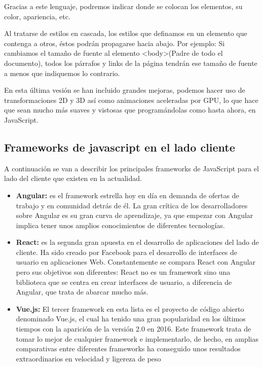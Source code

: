 Gracias a este lenguaje, podremos indicar donde se colocan los elementos, su color, apariencia, etc.

Al tratarse de estilos en cascada, los estilos que definamos en un elemento que contenga a otros, éstos podrán propagarse hacia abajo. Por ejemplo: Si cambiamos el tamaño de fuente al elemento <body>(Padre de todo el documento), todos los párrafos y links de la página tendrán ese tamaño de fuente a menos que indiquemos lo contrario.

En esta última vesión se han incluido grandes mejoras, podemos hacer uso de transformaciones 2D y 3D así como animaciones aceleradas por GPU, lo que hace que sean mucho más suaves y vistosas que programándolas como hasta ahora, en JavaScript.

\subsection*{Frameworks de javascript en el lado cliente}
A continuación se van a describir los principales frameworks de JavaScript para el lado del cliente que existen en la actualidad.

\begin{itemize}
    \item \textbf{Angular: } es el framework estrella hoy en día en demanda de ofertas de trabajo y en comunidad detrás de él.
    La gran crítica de los desarrolladores sobre Angular es su gran curva de aprendizaje, ya que empezar con Angular implica tener unos amplios conocimientos de diferentes tecnologías.
    \item \textbf{React: }es la segunda gran apuesta en el desarrollo de aplicaciones del lado de cliente. Ha sido creado por Facebook para el desarrollo de interfaces de usuario en aplicaciones Web. Constantemente se compara React con Angular pero sus objetivos son diferentes: React no es un framework sino una biblioteca que se centra en crear interfaces de usuario, a diferencia de Angular, que trata de abarcar mucho más.
    \item \textbf{Vue.js: } El tercer framework en esta lista es el proyecto de código abierto denominado Vue.js, el cual ha tenido una gran popularidad en los últimos tiempos con la aparición de la versión 2.0 en 2016. Este framework trata de tomar lo mejor de cualquier framework e implementarlo, de hecho, en amplias comparativas entre diferentes frameworks ha conseguido unos resultados extraordinarios en velocidad y ligereza de peso 
\end{itemize}
